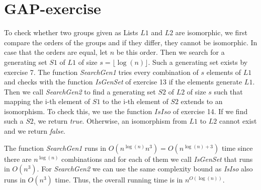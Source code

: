 \section{GAP-exercise}
To check whether two groups given as Lists $L1$ and $L2$ are isomorphic, we first compare the orders of the groups and if they differ, they cannot be isomorphic. In case that the orders are equal, let $n$ be this order. Then we search for a generating set $S1$ of $L1$ of size $s = \lfloor \log(n) \rfloor$. Such a generating set exists by exercise 7. The function \textit{SearchGen1} tries every combination of $s$ elements of $L1$ and checks with the function \textit{IsGenSet} of exercise 13 if the elements generate $L1$. Then we call \textit{SearchGen2} to find a generating set $S2$ of $L2$ of size $s$ such that mapping the i-th element of $S1$ to the i-th element of $S2$ extends to an isomorphism. To check this, we use the function $IsIso$ of exercise 14. If we find such a $S2$, we return \textit{true}. Otherwise, an isomorphism from $L1$ to $L2$ cannot exist and we return \textit{false}.



The function \textit{SearchGen1} runs in $O(n^{\log(n)} n^3) = O(n^{\log(n)+3})$ time since there are $n^{\log(n)}$ combinations and for each of them we call \textit{IsGenSet} that runs in $O(n^3)$. For \textit{SearchGen2} we can use the same complexity bound as \textit{IsIso} also runs in $O(n^3)$ time. Thus, the overall running time is in $n^{O(\log(n))}$.